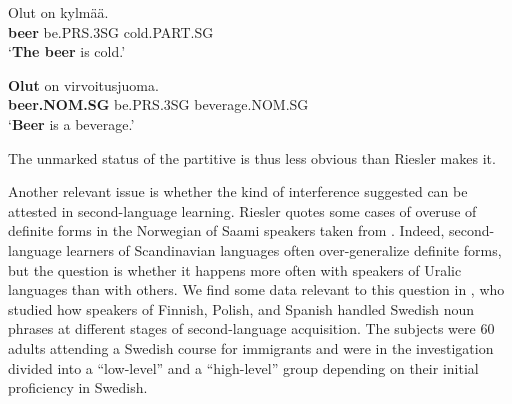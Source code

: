
 \ea\label{}
\gll Olut  on\textsuperscript{  }kylmää.\\


\textbf{beer} be.PRS.3SG  cold.PART.SG\\

\glt ‘\textbf{The beer} is cold.’

\z

\item 


 \ea\label{}
\gll \textbf{Olut} on  virvoitusjuoma.\\


\textbf{beer.NOM.SG} be.PRS.3SG  beverage.NOM.SG\\

\glt ‘\textbf{Beer} is a beverage.’

\z

The unmarked status of the partitive is thus less obvious than Riesler makes it. 


Another relevant issue is whether the kind of interference suggested can be attested in second-language learning. Riesler quotes some cases of overuse of definite forms in the Norwegian of Saami speakers taken from \citet{Bull1995}. Indeed, second-language learners of Scandinavian languages often over-generalize definite forms, but the question is whether it happens more often with speakers of Uralic languages than with others. We find some data relevant to this question in \citet{Axelsson1994}, who studied how speakers of Finnish, Polish, and Spanish handled Swedish noun phrases at different stages of second-language acquisition. The subjects were 60 adults attending a Swedish course for immigrants and were in the investigation divided into a “low-level” and a “high-level” group depending on their initial proficiency in Swedish.


